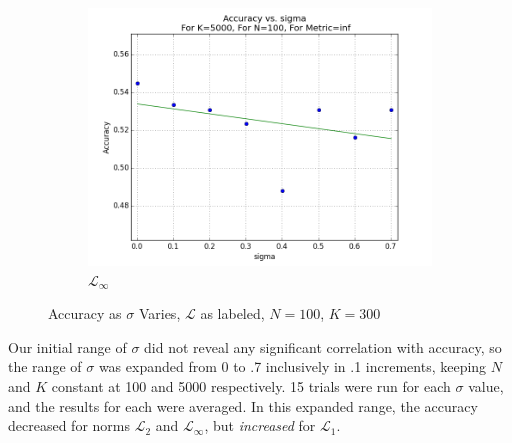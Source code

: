 \documentclass{article}
\begin{document}
\begin{figure}[H]
\centering
   \ContinuedFloat 
    \begin{subfigure}[h]{.75\textwidth}
        \includegraphics[width=\textwidth]{experiment1-2-varsigma-inf.png}
   	\caption{$\mathcal{L}_{\infty}$}
    \end{subfigure}    
    \caption{Accuracy as $\sigma$ Varies, $\mathcal{L}$ as labeled, $N=100$, $K=300$}
    \label{fig:exp1-2-accuracy-s}
\end{figure}
Our initial range of $\sigma$  did not reveal any significant correlation with accuracy, so the range of $\sigma$ was expanded from 0  to .7 inclusively in .1 increments, keeping $N$ and $K$ constant at 100 and 5000 respectively. 15 trials were run for each $\sigma$ value, and the results for each were averaged. In this expanded range, the accuracy decreased for norms $\mathcal{L}_{2}$ and $\mathcal{L}_{\infty}$, but \emph{increased} for $\mathcal{L}_{1}$.
\end{document}
